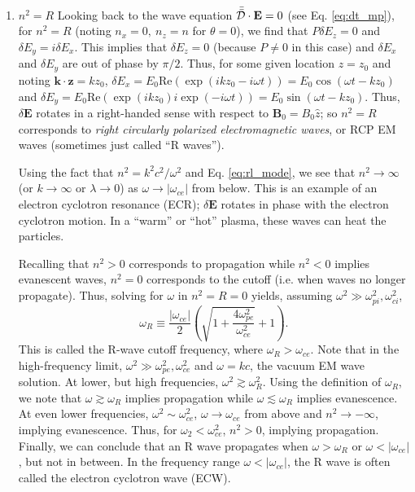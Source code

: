 \begin{itemize}
\begin{enumerate}
			\item{$n^2=R$}
			Looking back to the wave equation $\bar{\bar{\mathcal{D}}}\cdot\mathbf{E}=0$ (see Eq. \ref{eq:dt_mp}), for $n^2=R$ (noting $n_x=0,~n_z=n$ for $\theta=0$), we find that $P\delta E_z=0$ and $\delta E_y=i\delta E_x$. This implies that $\delta E_z=0$ (because $P\neq0$ in this case) and $\delta E_x$ and $\delta E_y$ are out of phase by $\pi/2$. Thus, for some given location $z=z_0$ and noting $\mathbf{k}\cdot\mathbf{z}=kz_0$, $\delta E_x=E_0\mathrm{Re}(\exp{(ikz_0-i\omega t)})=E_0\cos{(\omega t-kz_0)}$ and $\delta E_y=E_0\mathrm{Re}(\exp{(ikz_0)}i\exp{(-i\omega t)})=E_0\sin{(\omega t - kz_0)}$. Thus, $\delta\mathbf{E}$ rotates in a right-handed sense with respect to $\mathbf{B}_0=B_0\hat{z}$; so $n^2=R$ corresponds to \textit{right circularly polarized electromagnetic waves}, or RCP EM waves (sometimes just called ``R waves'').
			\par Using the fact that $n^2=k^2c^2/\omega^2$ and Eq. \ref{eq:rl_mode}, we see that $n^2\to\infty$ (or $k\to\infty$ or $\lambda\to0$) as $\omega\to|\omega_{ce}|$ from below. This is an example of an electron cyclotron resonance (ECR); $\delta\mathbf{E}$ rotates in phase with the electron cyclotron motion. In a ``warm'' or ``hot'' plasma, these waves can heat the particles.
			\par Recalling that $n^2>0$ corresponds to propagation while $n^2<0$ implies evanescent waves, $n^2=0$ corresponds to the cutoff (i.e. when waves no longer propagate). Thus, solving for $\omega$ in $n^2=R=0$ yields, assuming $\omega^2\gg\omega_{pi}^2,\omega_{ci}^2$,
			\begin{equation}
				\omega_R\equiv\frac{|\omega_{ce}|}{2}\left(\sqrt{1+\frac{4\omega_{pe}^2}{\omega_{ce}^2}} + 1\right).
			\end{equation}
			This is called the R-wave cutoff frequency, where $\omega_R>\omega_{ce}$. Note that in the high-frequency limit, $\omega^2\gg\omega_{pe}^2,\omega_{ce}^2$ and $\omega=kc$, the vacuum EM wave solution. At lower, but high frequencies, $\omega^2\gtrsim\omega_R^2$. Using the definition of $\omega_R$, we note that $\omega\gtrsim\omega_R$ implies propagation while $\omega\lesssim\omega_R$ implies evanescence. At even lower frequencies, $\omega^2\sim\omega_{ce}^2$, $\omega\to\omega_{ce}$ from above and $n^2\to-\infty$, implying evanescence. Thus, for $\omega_2<\omega_{ce}^2$, $n^2>0$, implying propagation. Finally, we can conclude that an R wave propagates when $\omega>\omega_R$ or $\omega<|\omega_{ce}|$, but not in between. In the frequency range $\omega<|\omega_{ce}|$, the R wave is often called the electron cyclotron wave (ECW). 

\end{enumerate}
\end{itemize}
